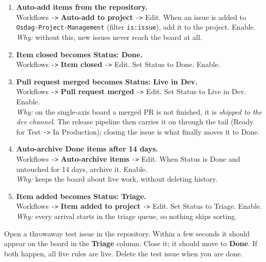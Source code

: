 \documentclass[11pt,a4paper]{report}
\newcommand{\code}[1]{\texttt{#1}}
\begin{document}
\begin{enumerate}[leftmargin=1.7em,itemsep=5pt]
  \item \textbf{Auto-add items from the repository.}\\
        Workflows \code{->} \textbf{Auto-add to project} \code{->} Edit. When an
        issue is added to \code{Osdag-Project-Management} (filter \code{is:issue}), add it to
        the project. Enable.\\
        \emph{Why:} without this, new issues never reach the board at all.
  \item \textbf{Item closed becomes Status: Done.}\\
        Workflows \code{->} \textbf{Item closed} \code{->} Edit. Set Status to Done.
        Enable.
  \item \textbf{Pull request merged becomes Status: Live in Dev.}\\
        Workflows \code{->} \textbf{Pull request merged} \code{->} Edit. Set Status
        to Live in Dev. Enable.\\
        \emph{Why:} on the single-axis board a merged PR is not finished, it is
        \emph{shipped to the dev channel}. The release pipeline then carries it on
        through the tail (Ready for Test \code{->} In Production); closing the issue
        is what finally moves it to Done.
  \item \textbf{Auto-archive Done items after 14 days.}\\
        Workflows \code{->} \textbf{Auto-archive items} \code{->} Edit. When Status
        is Done and untouched for 14 days, archive it. Enable.\\
        \emph{Why:} keeps the board about live work, without deleting history.
  \item \textbf{Item added becomes Status: Triage.}\\
        Workflows \code{->} \textbf{Item added to project} \code{->} Edit. Set
        Status to Triage. Enable.\\
        \emph{Why:} every arrival starts in the triage queue, so nothing skips
        sorting.
\end{enumerate}

\begin{verifybox}
Open a throwaway test issue in the repository. Within a few seconds it should appear
on the board in the \textbf{Triage} column. Close it; it should move to
\textbf{Done}. If both happen, all five rules are live. Delete the test issue when
you are done.
\end{verifybox}
\end{document}
